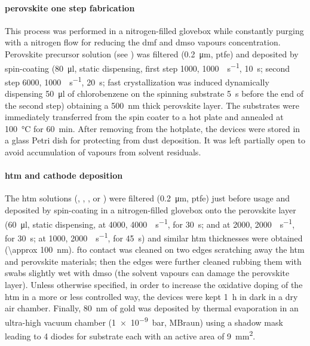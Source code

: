 
\paragraph{ perovskite one step fabrication}

This process was performed in a nitrogen-filled glovebox
while constantly purging with a nitrogen flow for reducing the \gls{dmf} and \gls{dmso} vapours concentration.
Perovskite precursor solution (see ) was filtered (\SI{0.2}{\um}, \gls{ptfe})
and deposited by spin-coating (\SI{80}{\ul}, static dispensing, first step \SI{1000}{\rpm}, \SI{1000}{\rpm\per\s}, \SI{10}{\s};
second step \SI{6000}{\rpm}, \SI{1000}{\rpm\per\s}, \SI{20}{\s}; fast crystallization was induced dynamically
dispensing \SI{50}{\ul} of chlorobenzene on the spinning substrate \SI{5}{\s} before the end of the second
step) obtaining a \SI{500}{\nm} thick perovskite layer.
The substrates were immediately transferred from
the spin coater to a hot plate and annealed at \SI{100}{\celsius} for \SI{60}{\minute}.
After removing from the hotplate, the devices were stored in a glass Petri dish for protecting from dust deposition. It was left partially open to avoid accumulation of vapours from solvent residuals.

\paragraph{\Gls{htm} and cathode deposition}
The \gls{htm} solutions (\spiro, , , or ) were filtered (\SI{0.2}{\um}, \gls{ptfe}) just before usage and deposited by spin-coating in a nitrogen-filled glovebox
onto the perovskite layer (\SI{60}{\ul}, static dispensing, \spiro at \SI{4000}{\rpm}, \SI{4000}{\rpm\per\s},
for \SI{30}{\s};  and  at \SI{2000}{\rpm}, \SI{2000}{\rpm\per\s}, for \SI{30}{\s};  at \SI{1000}{\rpm}, \SI{2000}{\rpm\per\s},
for \SI{45}{\s}) and similar \gls{htm} thicknesses were obtained (\SI{\approx 100}{\nm}).
\Gls{fto} contact was cleaned on two edges scratching away the \gls{htm} and perovskite materials; then the edges were further cleaned rubbing them with swabs slightly wet with \gls{dmso} (the solvent vapours can damage the perovskite layer). %
Unless otherwise specified, in order to increase the
oxidative doping of the \gls{htm} in a more or less controlled way, the devices were kept \SI{1}{\hour} in dark in a dry air chamber.
Finally, \SI{80}{\nm} of gold was deposited by thermal evaporation in an ultra-high vacuum chamber
(\SI{1e-9}{\bar}, MBraun) using a shadow mask leading to 4 diodes for substrate each with an active area of
\SI{9}{\mm\squared}.

